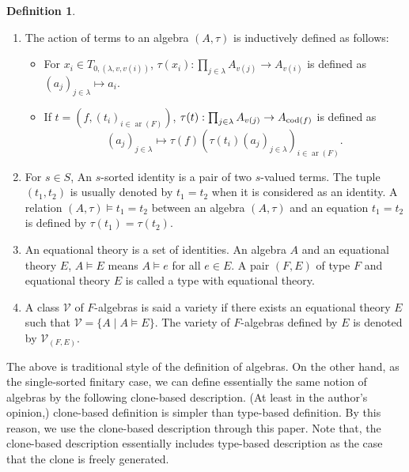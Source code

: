 \documentclass[a4paper,10pt]{article}
\theoremstyle{definition}
\newtheorem{df}{Definition}[section]
\newcommand\ra{\rightarrow}
\newcommand\V{\mathcal{V}}
\DeclareMathOperator{\ari}{ar}
\DeclareMathOperator{\Ht}{Ht}
\newcommand\dom{{\rm dom}}
\newcommand\cod{{\rm cod}}
\begin{document}
\begin{df}
\begin{enumerate}
\begin{itemize}
(The set of variable symbols.)
\item
$T_{\alpha+1,(\lambda,v,s)}:=T_{\alpha,(\lambda,v,s)}\cup
\{(f,(t_i)_{i\in \ari(F)})\mid 
 f\in F,t_i\in T_{\alpha,(\lambda,v,\dom(f)(i))},\cod(f)=s\}$.
\item
$T_{\alpha,(\lambda,v,s)}:=\bigcup_{\beta<\alpha} T_{\beta,(\lambda,v,s)}$
if $\alpha$ is a limit ordinal.
\end{itemize}
The set of all $(\lambda,v)$-ary $s$-valued terms of $F$ is $T_{\Ht(F),(\lambda,v,s)}$.
\item
The action of terms to an algebra $(A,\tau)$ is inductively defined as follows:
\begin{itemize}
\item
For $x_i\in T_{0,(\lambda,v,v(i))}$, $\tau(x_i):\prod_{j\in \lambda}A_{v(j)}\ra A_{v(i)}$ is defined as $(a_j)_{j\in\lambda}\mapsto a_i$.
\item
If $t=(f,(t_i)_{i\in \ari(F)})$,
$\tau(t):\prod_{j\in \lambda}A_{v(j)}\ra A_{\cod(f)}$ is defined as
\[
(a_j)_{j\in\lambda}\mapsto \tau(f)(\tau(t_i)(a_j)_{j\in\lambda})_{i\in\ari(F)}.
\]
\end{itemize}
\item
For $s\in S$, An $s$-sorted identity is a pair of two $s$-valued terms.
The tuple $(t_1,t_2)$ is usually denoted by
$t_1=t_2$ when it is considered as an identity.
A relation $(A,\tau) \models t_1=t_2$ between an algebra $(A,\tau)$ and 
an equation $t_1=t_2$ is defined by $\tau(t_1)=\tau(t_2)$.
\item
An equational theory is a set of identities.
An algebra $A$ and an equational theory $E$,
$A\models E$ means $A\models e$ for all $e\in E$.
A pair $(F,E)$ of type $F$ and equational theory $E$ is called a 
type with equational theory.
\item
A class $\V$ of $F$-algebras is said a variety if there exists
an equational theory $E$ such that \mbox{$\V=\{A\mid A\models E\}$}.
The variety of $F$-algebras defined by $E$ is denoted by $\V_{(F,E)}$.
\end{enumerate}
\end{df}

The above is traditional style of the definition of algebras.
On the other hand, as the single-sorted finitary case,
we can define essentially the same notion of algebras by
the following clone-based description.
(At least in the author's opinion,) clone-based definition is simpler
than type-based definition.
By this reason, we use the clone-based description through this paper.
Note that, the clone-based description essentially includes type-based description
as the case that the clone is freely generated.
\end{document}
